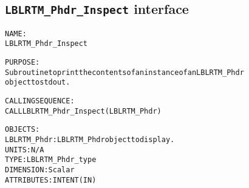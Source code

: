 \subsection{\texttt{LBLRTM\_Phdr\_Inspect} interface}
  \label{sec:LBLRTM_Phdr_Inspect_interface}
  \begin{alltt}
 
  NAME:
        LBLRTM_Phdr_Inspect
 
  PURPOSE:
        Subroutine to print the contents of an instance of an LBLRTM_Phdr
        object to stdout.
 
  CALLING SEQUENCE:
        CALL LBLRTM_Phdr_Inspect( LBLRTM_Phdr )
 
  OBJECTS:
        LBLRTM_Phdr:   LBLRTM_Phdr object to display.
                       UNITS:      N/A
                       TYPE:       LBLRTM_Phdr_type
                       DIMENSION:  Scalar
                       ATTRIBUTES: INTENT(IN)
 
  \end{alltt}
